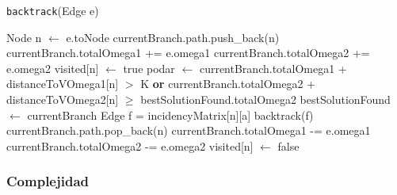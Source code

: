 \begin{algorithm}[H]
    \caption{\texttt{backtrack}(Edge e)}
\begin{algorithmic}[1]
  \State Node n $\leftarrow$ e.toNode
  \State currentBranch.path.push\_back(n)
  \State currentBranch.totalOmega1 += e.omega1
  \State currentBranch.totalOmega2 += e.omega2
  \State visited[n] $\leftarrow$ true
  \State podar $\leftarrow$ currentBranch.totalOmega1 + distanceToVOmega1[n] $>$ K \textbf{or} currentBranch.totalOmega2 + distanceToVOmega2[n] $\geq$ bestSolutionFound.totalOmega2
      \State bestSolutionFound $\leftarrow$ currentBranch
  \Else{}
          \State Edge f = incidencyMatrix[n][a]
          \State backtrack(f)
	\EndIf
      \EndFor
  \EndIf
  \EndIf
  \State currentBranch.path.pop\_back(n)
  \State currentBranch.totalOmega1 -= e.omega1
  \State currentBranch.totalOmega2 -= e.omega2
  \State visited[n] $\leftarrow$ false
\end{algorithmic}
\end{algorithm}

\subsubsection{Complejidad}

%
%

